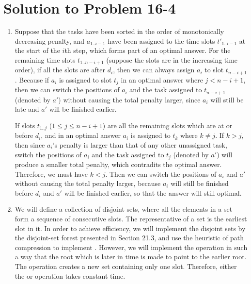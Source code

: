 \documentclass[fleqn]{article}
\begin{document}
\section*{Solution to Problem 16-4}

\begin{enumerate}
\renewcommand{\labelenumi}{\itshape \bfseries \alph{enumi}.}

\item  %

Suppose that the tasks have been sorted in the order of monotonically
decreasing penalty, and $a_{1..i-1}$ have been assigned to the time
slots $t'_{1..i-1}$ at the start of the $i$th step, which forms part
of an optimal answer. For the remaining time slots $t_{1..n-i+1}$
(suppose the slots are in the increasing time order), if all the slots
are after $d_i$, then we can always assign $a_i$ to slot $t_{n-i+1}$.
Because if $a_i$ is assigned to slot $t_j$ in an optimal answer where
$j < n-i+1$, then we can switch the positions of $a_i$ and the task
assigned to $t_{n-i+1}$ (denoted by $a'$) without causing the total
penalty larger, since $a_i$ will still be late and $a'$ will be
finished earlier.

If slots $t_{1..j}$ ($1 \leq j \leq n-i+1$) are all the remaining
slots which are at or before $d_i$, and in an optimal answer $a_i$ is
assigned to $t_k$ where $k \neq j$. If $k > j$, then since $a_i$'s
penalty is larger than that of any other unassigned task, switch the
positions of $a_i$ and the task assigned to $t_j$ (denoted by $a'$)
will produce a smaller total penalty, which contradits the optimal
answer. Therefore, we must have $k < j$. Then we can switch the
positions of $a_i$ and $a'$ without causing the total penalty larger,
because $a_i$ will still be finished before $d_i$ and $a'$ will be
finished earlier, so that the answer will still optimal.


\item  %

We will define a collection of disjoint sets, where all the elements
in a set form a sequence of consecutive slots. The representative of a
set is the earliest slot in it. In order to achieve efficiency, we
will implement the disjoint sets by the disjoint-set forest presented
in Section 21.3, and use the heuristic of path compression to
implement . However, we will implement the 
operation in such a way that the root which is later in time is made
to point to the earlier root. The  operation creates a
new set containing only one slot. Therefore, either the 
or  operation takes constant time.


\end{enumerate}
\end{document}
